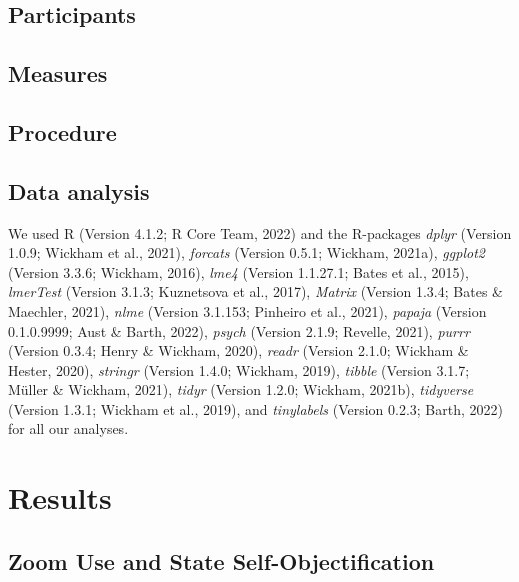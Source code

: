 \documentclass[
  english,
  man]{apa7}
\begin{document}
\hypertarget{participants}{%
\subsection{Participants}\label{participants}}

\hypertarget{measures}{%
\subsection{Measures}\label{measures}}

\hypertarget{procedure}{%
\subsection{Procedure}\label{procedure}}

\hypertarget{data-analysis}{%
\subsection{Data analysis}\label{data-analysis}}

We used R (Version 4.1.2; R Core Team, 2022) and the R-packages \emph{dplyr} (Version 1.0.9; Wickham et al., 2021), \emph{forcats} (Version 0.5.1; Wickham, 2021a), \emph{ggplot2} (Version 3.3.6; Wickham, 2016), \emph{lme4} (Version 1.1.27.1; Bates et al., 2015), \emph{lmerTest} (Version 3.1.3; Kuznetsova et al., 2017), \emph{Matrix} (Version 1.3.4; Bates \& Maechler, 2021), \emph{nlme} (Version 3.1.153; Pinheiro et al., 2021), \emph{papaja} (Version 0.1.0.9999; Aust \& Barth, 2022), \emph{psych} (Version 2.1.9; Revelle, 2021), \emph{purrr} (Version 0.3.4; Henry \& Wickham, 2020), \emph{readr} (Version 2.1.0; Wickham \& Hester, 2020), \emph{stringr} (Version 1.4.0; Wickham, 2019), \emph{tibble} (Version 3.1.7; Müller \& Wickham, 2021), \emph{tidyr} (Version 1.2.0; Wickham, 2021b), \emph{tidyverse} (Version 1.3.1; Wickham et al., 2019), and \emph{tinylabels} (Version 0.2.3; Barth, 2022) for all our analyses.

\hypertarget{results}{%
\section{Results}\label{results}}

\hypertarget{zoom-use-and-state-self-objectification}{%
\subsection{Zoom Use and State Self-Objectification}\label{zoom-use-and-state-self-objectification}}
\end{document}
